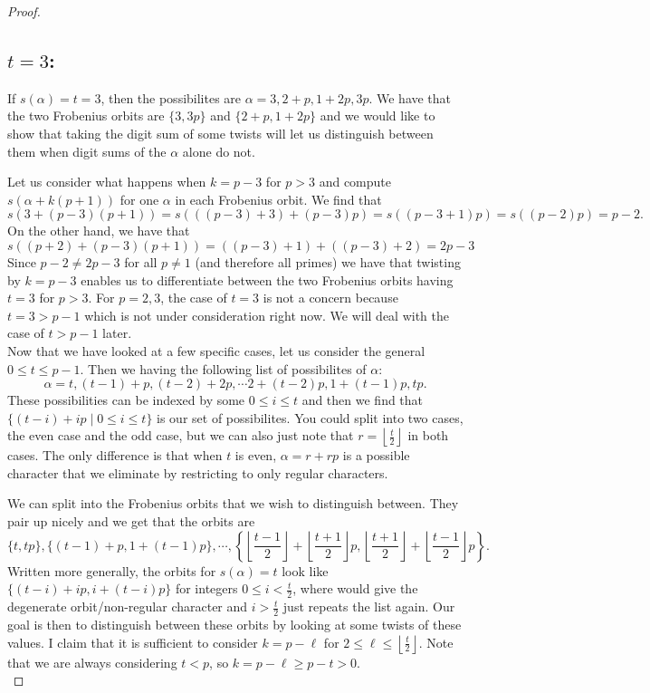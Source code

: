 \documentclass[12pt]{article}
\theoremstyle{customtheorem}%
\theoremstyle{remark}
\theoremstyle{definition}
\numberwithin{equation}{section}
\numberwithin{theorem}{section}
\begin{document}
\begin{proof}
\subsection{$t = 3$:} If $s(\alpha) = t= 3$, then the possibilites are $\alpha = 3,2+p,1+2p,3p$. We have that the two Frobenius orbits are $\{3,3p\}$ and $\{2+p, 1+2p\}$ and we would like to show that taking the digit sum of some twists will let us distinguish between them when digit sums of the $\alpha$ alone do not.

 Let us consider what happens when $k = p-3$ for $p > 3$ and compute $s(\alpha + k(p+1))$ for one $\alpha$ in each Frobenius orbit. We find that \[s(3 + (p-3)(p+1)) = s(((p-3)+3)+(p-3)p) = s((p-3+1)p) = s((p-2)p) = p-2.\] On the other hand, we have that \[s((p+2)+(p-3)(p+1)) = ((p-3)+1) + ((p-3)+2) =2p-3\]
 Since $p-2 \neq 2p-3$ for all $p \neq 1$ (and therefore all primes) we have that twisting by $k = p-3$ enables us to differentiate between the two Frobenius orbits having $t = 3$ for $p > 3$. For $p = 2,3$, the case of $t = 3$ is not a concern because $t =3 > p-1$ which is not under consideration right now. We will deal with the case of $t > p-1$ later.
\\

Now that we have looked at a few specific cases, let us consider the general $0 \leq t \leq p-1$. Then we having the following list of possibilites of $\alpha$: \[\alpha = t, (t-1) + p, (t-2) +2 p, \cdots 2 + (t-2)p , 1 + (t-1)p, tp.\] These possibilities can be indexed by some $0 \leq i \leq t$ and then we find that $\{ (t-i) + i p \mid 0 \leq i \leq t\}$ is our set of possibilites. You could split into two cases, the even case and the odd case, but we can also just note that $r = \left\lfloor \frac{t}{2} \right\rfloor$ in both cases. The only difference is that when $t$ is even, $\alpha = r + rp$ is a possible character that we eliminate by restricting to only regular characters.

We can split into the Frobenius orbits that we wish to distinguish between. They pair up nicely and we get that the orbits are \[\{t, tp\}, \{(t-1)+p, 1+(t-1)p\}, \cdots ,\left\{\left\lfloor \frac{t-1}{2} \right\rfloor + \left\lfloor \frac{t+1}{2} \right\rfloor p, \left\lfloor \frac{t+1}{2} \right\rfloor + \left\lfloor \frac{t-1}{2} \right\rfloor p\right\}.\] Written more generally, the orbits for $s(\alpha) = t$ look like $\{(t-i) + ip, i + (t-i)p\}$ for integers $0 \leq i <  \frac{t}{2} $, where  would give the degenerate orbit/non-regular character and $i > \frac{t}{2}$ just repeats the list again. Our goal is then to distinguish between these orbits by looking at some twists of these values. I claim that it is sufficient to consider $k = p - \ell$ for $2 \leq \ell \leq \left\lfloor\frac{t}{2} \right\rfloor$. Note that we are always considering $t < p$, so $k = p - \ell \geq p - t > 0$. 
\\


\end{proof}
\end{document}
